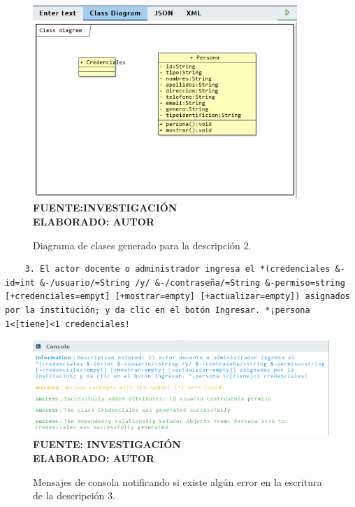  \begin{figure}[H]
 	\centering
 	\caption{Diagrama de clases generado para la descripción 2.}
 	\includegraphics[width=10cm]{img/dc-eva-002.png}
 	\label{fig:dc_eva_002}
 	\vspace{4mm}
 	{\footnotesize \textbf{\\ FUENTE:INVESTIGACIÓN} \textbf{\\ ELABORADO: AUTOR}}
 \end{figure}
 
 \begin{lstlisting}
 	3. El actor docente o administrador ingresa el *(credenciales &-id=int &-/usuario/=String /y/ &-/contraseña/=String &-permiso=string [+credenciales=empyt] [+mostrar=empty] [+actualizar=empty]) asignados por la institución; y da clic en el botón Ingresar. *¡persona 1<[tiene]<1 credenciales! \end{lstlisting}
 
  \begin{figure}[h!]
  	\centering
 	\caption{Mensajes de consola notificando si existe algún error en la escritura de la descripción 3.}
 	\includegraphics[width=14cm]{img/not-eva-003.png}
 	\label{fig:not_eva_003}
 	\vspace{4mm}
 	{\footnotesize \textbf{\\ FUENTE: INVESTIGACIÓN} \textbf{\\ ELABORADO: AUTOR}}
 \end{figure}
 

